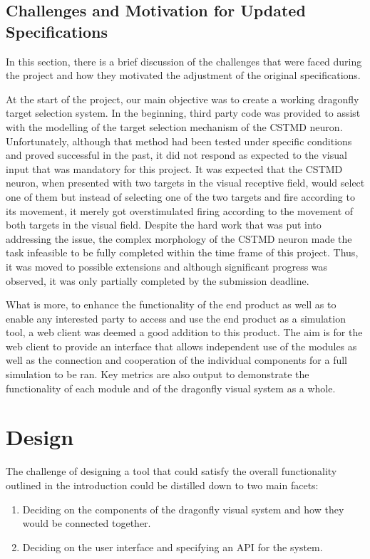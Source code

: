 \documentclass[a4paper,11pt]{article}
\begin{document}
\subsection{Challenges and Motivation for Updated Specifications}
In this section, there is a brief discussion of the challenges that were faced during the project and how they motivated the adjustment of the original specifications.\par
	At the start of the project, our main objective was to create a working dragonfly target selection system. In the beginning, third party code was provided to assist with the modelling of the target selection mechanism of the CSTMD neuron. Unfortunately, although that method had been tested under specific conditions and proved successful in the past, it did not respond as expected to the visual input that was mandatory for this project. It was expected that the CSTMD neuron, when presented with two targets in the visual receptive field, would select one of them but instead of selecting one of the two targets and fire according to its movement, it merely got overstimulated firing according to the movement of both targets in the visual field. Despite the hard work that was put into addressing the issue, the complex morphology of the CSTMD neuron made the task infeasible to be fully completed within the time frame of this project. Thus, it was moved to possible extensions and although significant progress was observed, it was only partially completed by the submission deadline.\par
	What is more, to enhance the functionality of the end product as well as to enable any interested party to access and use the end product as a simulation tool, a web client was deemed a good addition to this product. The aim is for the web client to provide an interface that allows independent use of the modules as well as the connection and cooperation of the individual components for a full simulation to be ran. Key metrics are also output to demonstrate the functionality of each module and of the dragonfly visual system as a whole.


\clearpage
\section{Design}

The challenge of designing a tool that could satisfy the overall functionality outlined in the introduction could be distilled down to two main facets:
\begin{enumerate}
\item Deciding on the components of the dragonfly visual system and how they would be connected together.
\item Deciding on the user interface and specifying an API for the system.
\end{enumerate}
\end{document}
